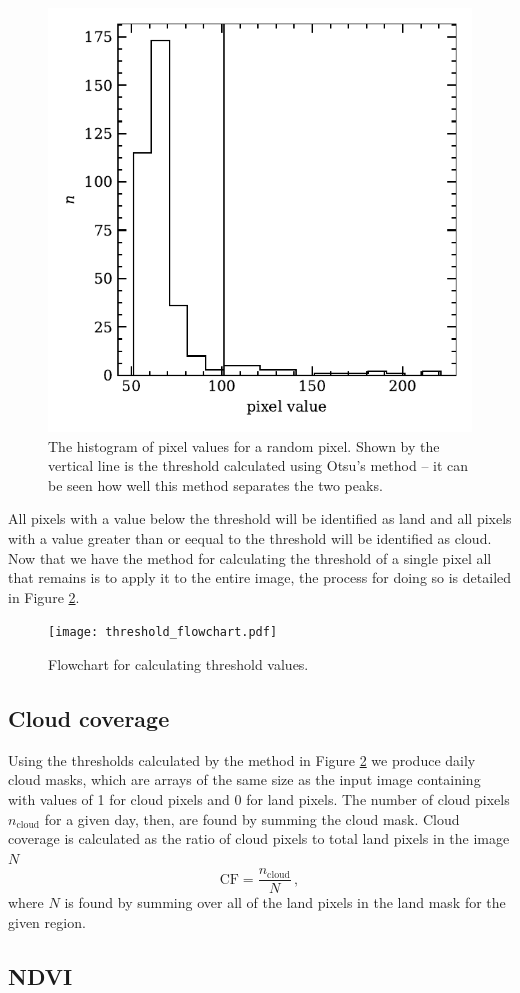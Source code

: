 \begin{figure}
  \centering
    \includegraphics[width=\linewidth]{figures/otsu_bimodal.pdf}
    \caption{The histogram of pixel values for a random pixel. Shown
      by the vertical line is the threshold calculated using Otsu's method -- it can
      be seen how well this method separates the two peaks.}
    \label{fig:otsu}
\end{figure}
All pixels with a value below the threshold will be identified as land and all
pixels with a value greater than or eequal to the threshold will be identified
as cloud. Now that we have the method for calculating the threshold of a single
pixel all that remains is to apply it to the entire image, the process for doing
so is detailed in Figure \ref{fig:thr_fc}.
\begin{figure}[t!]
  \centering
  \texttt{[image: threshold\_flowchart.pdf]}
  \caption{Flowchart for calculating threshold values.}
  \label{fig:thr_fc}
\end{figure}

\subsection{Cloud coverage}
Using the thresholds calculated by the method in Figure \ref{fig:thr_fc} we
produce daily cloud masks, which are arrays of the same size as the input image
containing with values of 1 for cloud pixels and 0 for land pixels. The number
of cloud pixels $n_{\mathrm{cloud}}$ for a given day, then, are found by summing
the cloud mask. Cloud coverage is calculated as the ratio of cloud pixels to
total land pixels in the image $N$
\begin{equation}
  \mathrm{CF} = \frac{n_{\mathrm{cloud}}}{N} \,,
  \label{eq:cloud_frac}
\end{equation}
where $N$ is found by summing over all of the land pixels in the land mask for
the given region.

\subsection{NDVI}
